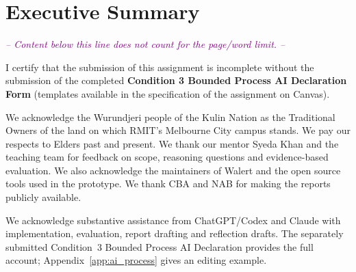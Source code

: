 \documentclass[a4paper, table, 11pt]{article}
\begin{document}
\section*{Executive Summary}

\newpage
{}
\tableofcontents\thispagestyle{empty}
\newpage
\listoffigures\thispagestyle{empty}
\vspace{1.2em}
\listoftables\thispagestyle{empty}
\newpage
{}





\clearpage
\begin{center}
    \noindent\textcolor{purple}{\emph{-- Content below this line does not count for the page/word limit. --}}
\end{center}
I certify that the submission of this assignment is incomplete without the submission of the completed \textbf{Condition 3 Bounded Process AI Declaration Form} (templates available in the specification of the assignment on Canvas).
\begin{acks}
We acknowledge the Wurundjeri people of the Kulin Nation as the Traditional Owners of the land on which RMIT's Melbourne City campus stands. We pay our respects to Elders past and present. We thank our mentor Syeda Khan and the teaching team for feedback on scope, reasoning questions and evidence-based evaluation. We also acknowledge the maintainers of Walert and the open source tools used in the prototype. We thank CBA and NAB for making the reports publicly available.


We acknowledge substantive assistance from ChatGPT/Codex and Claude with implementation, evaluation, report drafting and reflection drafts. The separately submitted Condition~3 Bounded Process AI Declaration provides the full account; Appendix~\ref{app:ai_process} gives an editing example.
\end{acks}


\appendix

\end{document}

